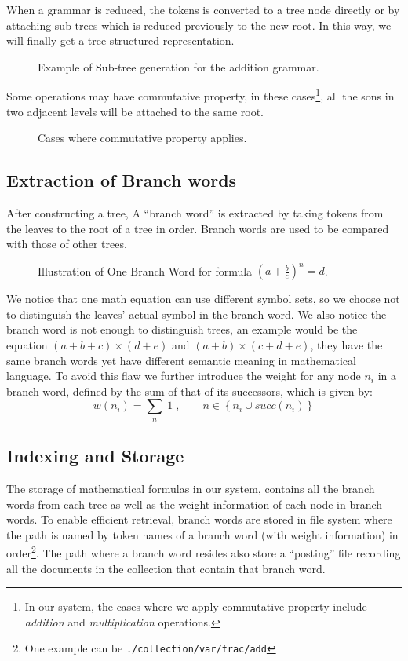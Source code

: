 \documentclass{acm_proc_article-sp}
\begin{document}
When a grammar is reduced, the tokens is converted to a tree node directly or by attaching sub-trees which is reduced previously to the new root. In this way, we will finally get a tree structured representation.

\begin{figure}
\caption{Example of Sub-tree generation for the addition grammar.}
\end{figure}

Some operations may have commutative property, in these cases\footnote{In our system, the cases where we apply commutative property include \textit{addition} and \textit{multiplication} operations.}, all the sons in two adjacent levels will be attached to the same root.

\begin{figure}
\caption{Cases where commutative property applies.}
\end{figure}

\subsection{Extraction of Branch words}
After constructing a tree, A ``branch word'' is extracted by taking tokens from the leaves to the root of a tree in order. Branch words are used to be compared with those of other trees. 

\begin{figure}
\centering
{}
\caption{Illustration of One Branch Word for formula $(a+\frac{b}{c})^n = d$.}
\end{figure}

We notice that one math equation can use different symbol sets, so we choose not to distinguish the leaves' actual symbol in the branch word. We also notice the branch word is not enough to distinguish trees, an example would be the equation $(a + b + c)\times (d + e)$ and $(a + b) \times (c + d + e)$, they have the same branch words yet have different semantic meaning in mathematical language. To avoid this flaw we further introduce the weight for any node $n_i$ in a branch word, defined by the sum of that of its successors, which is given by:
$$
w(n_i) = \sum\limits_{n} \; 1 \;, \qquad n \in \left\{n_i \cup succ(n_i) \right\}
$$

\subsection{Indexing and Storage}
The storage of mathematical formulas in our system, contains all the branch words from each tree as well as the weight information of each node in branch words. To enable efficient retrieval, branch words are stored in file system where the path is named by token names of a branch word (with weight information) in order\footnote{One example can be \texttt{./collection/var/frac/add}}. The path where a branch word resides also store a ``posting'' file recording all the documents in the collection that contain that branch word.
\end{document}
